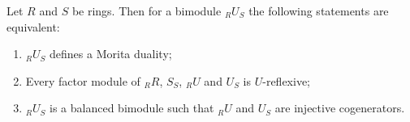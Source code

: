 Let $R$ and $S$ be rings. Then for a bimodule ${}_R U_S$ the following statements are equivalent:

\begin{enumerate}
\item[(a)] ${}_R U_S$ defines a Morita duality;
\item[(b)] Every factor module of ${}_R R$, $S_S$, ${}_R U$ and $U_S$ is $U$-reflexive;
\item[(c)] ${}_R U_S$ is a balanced bimodule such that ${}_R U$ and $U_S$ are injective cogenerators.
\end{enumerate}
